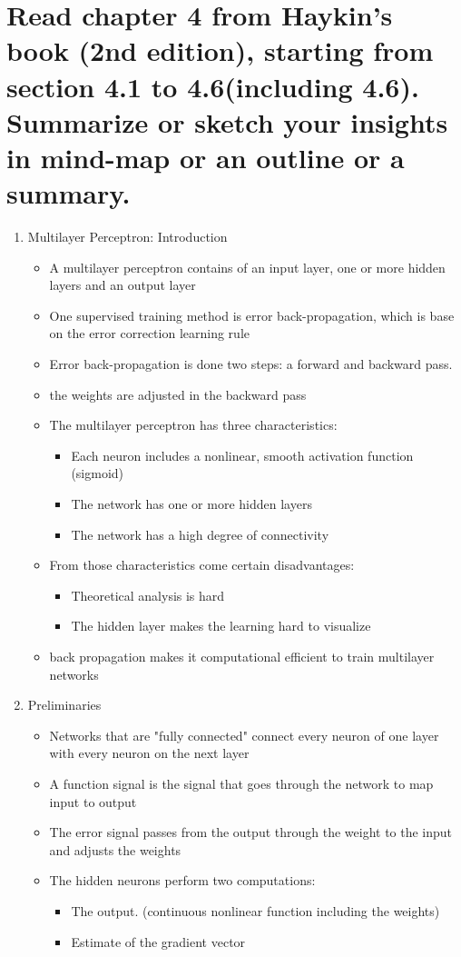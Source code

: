 \documentclass{scrartcl}
\begin{document}
\section{Read chapter 4 from Haykin’s book (2nd edition), starting from section 4.1 to
4.6(including 4.6). Summarize or sketch your insights in mind-map or an outline or a
summary.}

\begin{enumerate}
\item Multilayer Perceptron: Introduction
	\begin{itemize}
	\item A multilayer perceptron contains of an input layer, one or more hidden layers and an output layer
	\item One supervised training method is error back-propagation, which is base on the error correction learning rule
	\item Error back-propagation is done two steps: a forward and backward pass. 
	\item the weights are adjusted in the backward pass
	\item The multilayer perceptron has three characteristics:
		\begin{itemize}
		\item Each neuron includes a nonlinear, smooth activation function (sigmoid)
		\item The network has one or more hidden layers 
		\item The network has a high degree of connectivity
		\end{itemize}
	\item From those characteristics come certain disadvantages:
		\begin{itemize}
		\item Theoretical analysis is hard
		\item The hidden layer makes the learning hard to visualize
		\end{itemize}
	\item back propagation makes it computational efficient to train multilayer networks
	\end{itemize}
	
\item Preliminaries
	\begin{itemize}
	\item Networks that are "fully connected" connect every neuron of one layer with every neuron on the next layer
	\item A function signal is the signal that goes through the network to map input to output
	\item The error signal passes from the output through the weight to the input and adjusts the weights
	\item The hidden neurons perform two computations:
		\begin{itemize}
		\item The output. (continuous nonlinear function including the weights)
		\item Estimate of the gradient vector
		\end{itemize}
	\end{itemize}
	

\end{enumerate}
\end{document}

